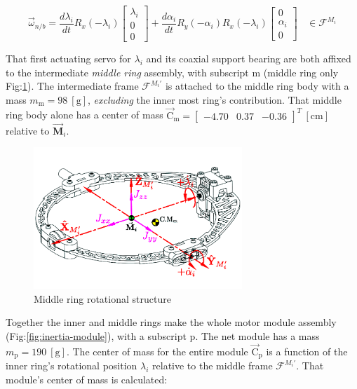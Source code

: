 \begin{equation}\label{eq:net-angular-inner}
\vec{\omega}_{n/b}=\frac{d\lambda_i}{dt}R_x(-\lambda_i)\begin{bmatrix}
\lambda_i\\
0\\
0
\end{bmatrix}
+\frac{d\alpha_i}{dt}R_y(-\alpha_i)R_x(-\lambda_i)\begin{bmatrix}
0\\
\alpha_i\\
0
\end{bmatrix}~~~~\in\mathcal{F}^{M_i}
\end{equation}
\par
That first actuating servo for $\lambda_i$ and its coaxial support bearing are both affixed to the intermediate \emph{middle ring} assembly, with subscript m (middle ring only Fig:\ref{fig:inertia-middle}). The intermediate frame $\mathcal{F}^{M_i'}$ is attached to the middle ring body with a mass $m_\text{m}=98~[\text{g}]$, \emph{excluding} the inner most ring's contribution. That middle ring body alone has a center of mass $\vec{\text{C}}_{\text{m}}=\begin{bmatrix}
-4.70&0.37&-0.36\end{bmatrix}^T~[\text{cm}]$ relative to $\vec{\mathbf{M}}_i$. 
\begin{figure}[htbp]
\centering
\includegraphics[width=0.7\textwidth]{figs/inertia-middle}
\vspace{-18pt}
\caption{Middle ring rotational structure}
\label{fig:inertia-middle}
\vspace{-12pt}
\end{figure}
\par
Together the inner and middle rings make the whole motor module assembly (Fig:\ref{fig:inertia-module}), with a subscript p. The net module has a mass $m_\text{p}=190~[\text{g}]$. The center of mass for the entire module $\vec{\text{C}}_\text{p}$ is a function of the inner ring's rotational position $\lambda_i$ relative to the middle frame $\mathcal{F}^{M_i'}$. That module's center of mass is calculated:
